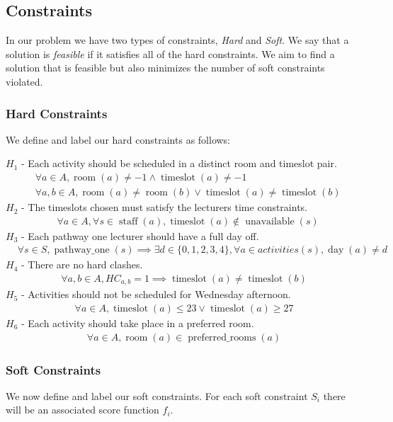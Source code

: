 \documentclass[12pt]{article}
\theoremstyle{definition}
\theoremstyle{plain}
\DeclareMathOperator{\staff}{staff}
\DeclareMathOperator{\ts}{timeslot}
\DeclareMathOperator{\room}{room}
\DeclareMathOperator{\prooms}{preferred\_rooms}
\DeclareMathOperator{\unv}{unavailable}
\DeclareMathOperator{\pathwayone}{pathway\_one}
\DeclareMathOperator{\dayow}{day}
\begin{document}
\subsection{Constraints}
In our problem we have two types of constraints, \textit{Hard} and \textit{Soft}. We say that a solution is \textit{feasible} if it satisfies all of the hard constraints. We aim to find a solution that is feasible but also minimizes the number of soft constraints violated.
\subsubsection{Hard Constraints}
We define and label our hard constraints as follows:

$H_1$ - Each activity should be scheduled in a distinct room and timeslot pair.
\begin{align*}
	&\forall a \in A, \room(a) \neq -1 \land \ts(a) \neq -1 \\
	&\forall a, b \in A,  \room(a) \neq \room(b) \lor \ts(a) \neq \ts(b)
\end{align*}
$H_2$ - The timeslots chosen must satisfy the lecturers time constraints.
\begin{align*}
&\forall a \in A, \forall s \in \staff(a), \ts(a) \not\in \unv(s) 
\end{align*}
$H_3$ - Each pathway one lecturer should have a full day off.
\begin{align*}
&\forall s \in S, \pathwayone(s) \implies \exists d \in \{0, 1, 2, 3, 4\}, \forall a \in activities(s), \dayow(a) \neq d
\end{align*}
$H_4$ - There are no hard clashes.
\begin{align*}
	\forall a,b \in A, HC_{a,b} = 1 \implies \ts(a) \neq \ts(b)
\end{align*}
$H_5$ - Activities should not be scheduled for Wednesday afternoon.
\begin{align*}
\forall a \in A, \ts(a) \leq 23 \lor \ts(a) \ge 27 
\end{align*}
$H_6$ - Each activity should take place in a preferred room.
\begin{align*}
	\forall a \in A, \room(a) \in \prooms(a)
\end{align*}

\subsubsection{Soft Constraints}

We now define and label our soft constraints. For each  soft constraint $S_i$ there will be an associated score function $f_i$.
\end{document}
